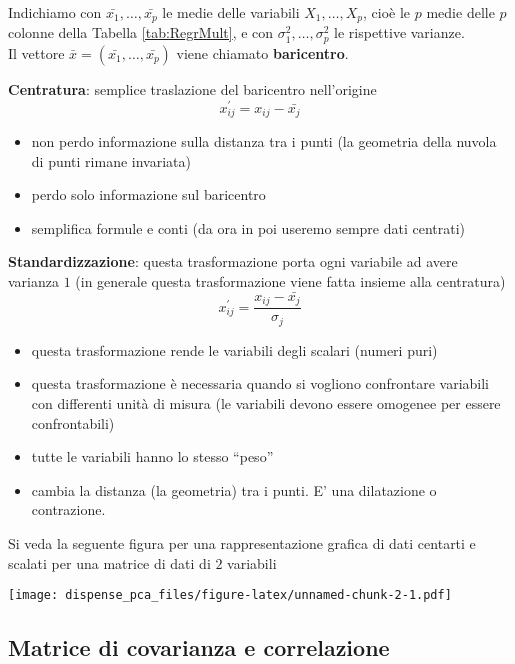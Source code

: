 \documentclass[
  11pt,
]{book}
\providecommand{\tightlist}{%
  \setlength{\itemsep}{0pt}\setlength{\parskip}{0pt}}
\begin{document}
Indichiamo con \(\bar{x_1},\dots,\bar{x_p}\) le medie delle variabili \(X_1,\dots,X_p\),
cioè le \(p\) medie delle \(p\) colonne della Tabella \ref{tab:RegrMult}, e con
\(\sigma_1^2,\dots,\sigma_p^2\) le rispettive varianze.\\
Il vettore \(\bar{x}=(\bar{x_1},\dots,\bar{x_p})\) viene chiamato \textbf{baricentro}.

\textbf{Centratura}: semplice traslazione del baricentro nell'origine
\begin{equation}
x_{ij}^{'}=x_{ij}-\bar{x_j}
\end{equation}

\begin{itemize}
\tightlist
\item
  non perdo informazione sulla distanza tra i punti (la geometria della nuvola di punti
  rimane invariata)
\item
  perdo solo informazione sul baricentro
\item
  semplifica formule e conti (da ora in poi useremo sempre dati centrati)
\end{itemize}

\textbf{Standardizzazione}: questa trasformazione porta ogni variabile ad avere varianza \(1\)
(in generale questa trasformazione viene fatta insieme alla centratura)
\begin{equation}
x_{ij}^{'}=\frac{x_{ij}-\bar{x_j}}{\sigma_j}
\end{equation}

\begin{itemize}
\tightlist
\item
  questa trasformazione rende le variabili degli scalari (numeri puri)
\item
  questa trasformazione è necessaria quando si vogliono confrontare variabili
  con differenti unità di misura (le variabili devono essere omogenee per essere confrontabili)
\item
  tutte le variabili hanno lo stesso ``peso''
\item
  cambia la distanza (la geometria) tra i punti. E' una dilatazione o contrazione.
\end{itemize}

Si veda la seguente figura per una rappresentazione grafica di dati centarti e
scalati per una matrice di dati di \(2\) variabili

\texttt{[image: dispense\_pca\_files/figure-latex/unnamed-chunk-2-1.pdf]}

\hypertarget{matrice-di-covarianza-e-correlazione}{%
\subsection{Matrice di covarianza e correlazione}\label{matrice-di-covarianza-e-correlazione}}
\end{document}
